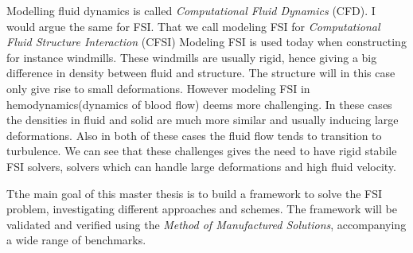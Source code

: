 Modelling fluid dynamics is called \textit{Computational Fluid Dynamics} (CFD). I would argue the same for FSI. That we call modeling FSI for \textit{Computational Fluid Structure Interaction} (CFSI)
Modeling FSI is used today when constructing for instance windmills. These windmills are usually rigid, hence giving a big difference in density between fluid and structure. The structure will in this case only give rise to small deformations. However modeling FSI in hemodynamics(dynamics of blood flow) deems more challenging. In these cases the densities in fluid and solid are much more similar and usually inducing large deformations. Also in both of these cases the fluid flow tends to transition to turbulence. We can see that these challenges gives the need to have rigid stabile FSI solvers, solvers which can handle large deformations and high fluid velocity. \newline

Tthe main goal of this master thesis is to build a framework to solve the FSI problem, investigating different approaches and schemes. The framework will be validated and verified using the \textit{Method of Manufactured Solutions}, accompanying a wide range of benchmarks.  

